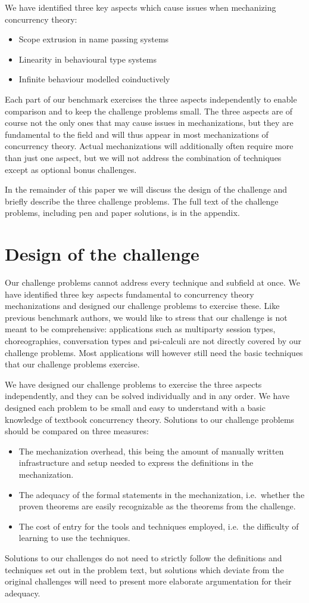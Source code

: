 \documentclass[adraft,copyright,creativecommons]{eptcs}
\begin{document}
We have identified three key aspects which cause issues when mechanizing concurrency theory:
\begin{itemize}
\item Scope extrusion in name passing systems
\item Linearity in behavioural type systems
\item Infinite behaviour modelled coinductively
\end{itemize}
Each part of our benchmark exercises the three aspects independently to enable comparison and to keep the challenge problems small.
The three aspects are of course not the only ones that may cause issues in mechanizations, but they are fundamental to the field and will thus appear in most mechanizations of concurrency theory.
Actual mechanizations will additionally often require more than just one aspect, but we will not address the combination of techniques except as optional bonus challenges.

In the remainder of this paper we will discuss the design of the challenge and briefly describe the three challenge problems.
The full text of the challenge problems, including pen and paper solutions, is in the appendix.

\section{Design of the challenge}
Our challenge problems cannot address every technique and subfield at once.
We have identified three key aspects fundamental to concurrency theory mechanizations and designed our challenge problems to exercise these.
Like previous benchmark authors, we would like to stress that our challenge is not meant to be comprehensive: applications such as multiparty session types, choreographies, conversation types and psi-calculi are not directly covered by our challenge problems.
Most applications will however still need the basic techniques that our challenge problems exercise.

We have designed our challenge problems to exercise the three aspects independently, and they can be solved individually and in any order.
We have designed each problem to be small and easy to understand with a basic knowledge of textbook concurrency theory.
Solutions to our challenge problems should be compared on three measures:
\begin{itemize}
\item The mechanization overhead, this being the amount of manually written infrastructure and setup needed to express the definitions in the mechanization.
\item The adequacy of the formal statements in the mechanization, i.e.\ whether the proven theorems are easily recognizable as the theorems from the challenge.
\item The cost of entry for the tools and techniques employed, i.e.\ the difficulty of learning to use the techniques.
\end{itemize}
Solutions to our challenges do not need to strictly follow the definitions and techniques set out in the problem text, but solutions which deviate from the original challenges will need to present more elaborate argumentation for their adequacy.
\end{document}
